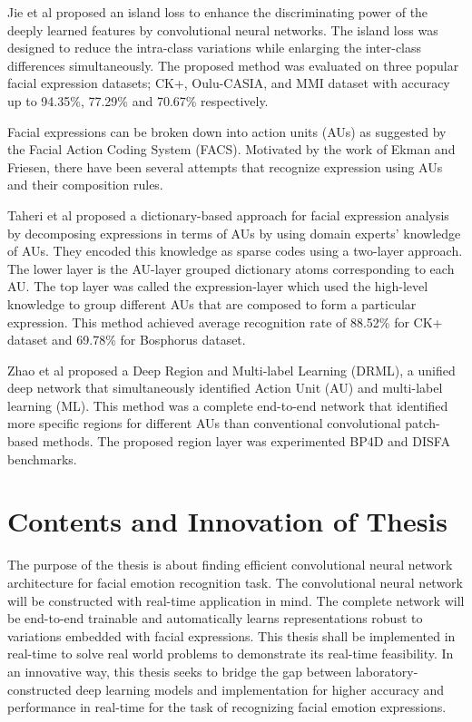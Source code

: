 \documentclass[master]{thesis-uestc}
\begin{document}
Jie et al proposed an island loss to enhance the discriminating power of the deeply learned features by convolutional neural networks. The island loss was designed to reduce the intra-class variations while enlarging the inter-class differences simultaneously. The proposed method was evaluated on three popular facial expression datasets; CK+, Oulu-CASIA, and MMI dataset with accuracy up to 94.35\%, 77.29\% and 70.67\% respectively.

Facial expressions can be broken down into action units (AUs) as suggested by the Facial Action Coding System (FACS). Motivated by the work of Ekman and Friesen, there have been several attempts that recognize expression using AUs and their composition rules.

Taheri et al proposed a dictionary-based approach for facial expression analysis by decomposing expressions in terms of AUs by using domain experts’ knowledge of AUs. They encoded this knowledge as sparse codes using a two-layer approach. The lower layer is the AU-layer grouped dictionary atoms corresponding to each AU. The top layer was called the expression-layer which used the high-level knowledge to group different AUs that are composed to form a particular expression. This method achieved average recognition rate of 88.52\% for CK+ dataset and 69.78\% for Bosphorus dataset.

Zhao et al proposed a Deep Region and Multi-label Learning (DRML), a unified deep network that simultaneously identified Action Unit (AU) and multi-label learning (ML). This method was a complete end-to-end network that identified more specific regions for different AUs than conventional convolutional patch-based methods. The proposed region layer was experimented BP4D  and DISFA benchmarks.

\section{Contents and Innovation of Thesis}
The purpose of the thesis is about finding efficient convolutional neural network architecture for facial emotion recognition task. The convolutional neural network will be constructed with real-time application in mind. The complete network will be end-to-end trainable and automatically learns representations robust to variations embedded with facial expressions. This thesis shall be implemented in real-time to solve real world problems to demonstrate its real-time feasibility. In an innovative way, this thesis seeks to bridge the gap between laboratory-constructed deep learning models and implementation for higher accuracy and performance in real-time for the task of recognizing facial emotion expressions.
\end{document}
